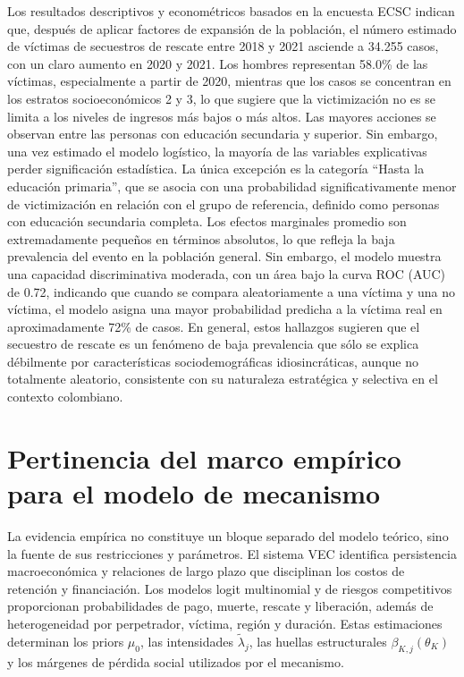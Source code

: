 \documentclass[12pt]{article}
\theoremstyle{definition}
\theoremstyle{remark}
\newcommand{\1}{\mathbf{1}}
\begin{document}
Los resultados descriptivos y econométricos basados en la encuesta ECSC indican que, después de aplicar factores de expansión de la población, el número estimado de víctimas de secuestros de rescate entre 2018 y 2021 asciende a 34.255 casos, con un claro aumento en 2020 y 2021. Los hombres representan 58.0\% de las víctimas, especialmente a partir de 2020, mientras que los casos se concentran en los estratos socioeconómicos 2 y 3, lo que sugiere que la victimización no es se limita a los niveles de ingresos más bajos o más altos. Las mayores acciones se observan entre las personas con educación secundaria y superior. Sin embargo, una vez estimado el modelo logístico, la mayoría de las variables explicativas perder significación estadística. La única excepción es la categoría “Hasta la educación primaria”, que se asocia con una probabilidad significativamente menor de victimización en relación con el grupo de referencia, definido como personas con educación secundaria completa. Los efectos marginales promedio son extremadamente pequeños en términos absolutos, lo que refleja la baja prevalencia del evento en la población general. Sin embargo, el modelo muestra una capacidad discriminativa moderada, con un área bajo la curva ROC (AUC) de 0.72, indicando que cuando se compara aleatoriamente a una víctima y una no víctima, el modelo asigna una mayor probabilidad predicha a la víctima real en aproximadamente 72\% de casos. En general, estos hallazgos sugieren que el secuestro de rescate es un fenómeno de baja prevalencia que sólo se explica débilmente por características sociodemográficas idiosincráticas, aunque no totalmente aleatorio, consistente con su naturaleza estratégica y selectiva en el contexto colombiano.



\section{Pertinencia del marco empírico para el modelo de mecanismo}
\label{sec:pertinencia}

La evidencia empírica no constituye un bloque separado del modelo teórico, sino la fuente de sus restricciones y parámetros. El sistema VEC identifica persistencia macroeconómica y relaciones de largo plazo que disciplinan los costos de retención y financiación. Los modelos logit multinomial y de riesgos competitivos proporcionan probabilidades de pago, muerte, rescate y liberación, además de heterogeneidad por perpetrador, víctima, región y duración. Estas estimaciones determinan los priors $\mu_0$, las intensidades $\tilde\lambda_j$, las huellas estructurales $\beta_{K,j}(\theta_K)$ y los márgenes de pérdida social utilizados por el mecanismo.
\end{document}
